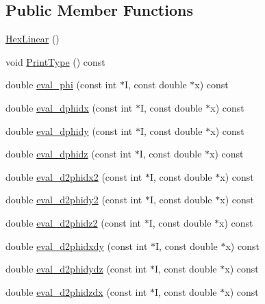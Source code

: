 \subsection*{Public Member Functions}
\begin{DoxyCompactItemize}
\item 
\mbox{\hyperlink{classfemus_1_1_hex_linear_a98a491b9c49bfb16056b1ef57e91d4a3}{Hex\+Linear}} ()
\item 
void \mbox{\hyperlink{classfemus_1_1_hex_linear_a6b28eaf73e48af3bf32ddd31991ec35e}{Print\+Type}} () const
\item 
double \mbox{\hyperlink{classfemus_1_1_hex_linear_ab6def48278382bd3f39856d158f08287}{eval\+\_\+phi}} (const int $\ast$I, const double $\ast$x) const
\item 
double \mbox{\hyperlink{classfemus_1_1_hex_linear_a4c26f08a33fb379f6d6b844ec0eac8c5}{eval\+\_\+dphidx}} (const int $\ast$I, const double $\ast$x) const
\item 
double \mbox{\hyperlink{classfemus_1_1_hex_linear_a04a870728a2d2d135fe8351315e42d7e}{eval\+\_\+dphidy}} (const int $\ast$I, const double $\ast$x) const
\item 
double \mbox{\hyperlink{classfemus_1_1_hex_linear_aed97c1006402d186cebd957fc3e20896}{eval\+\_\+dphidz}} (const int $\ast$I, const double $\ast$x) const
\item 
double \mbox{\hyperlink{classfemus_1_1_hex_linear_a76ae681b7882ed7ea9683dee6aabc5aa}{eval\+\_\+d2phidx2}} (const int $\ast$I, const double $\ast$x) const
\item 
double \mbox{\hyperlink{classfemus_1_1_hex_linear_a4a35e276ff9fac58e4ddd84ad147b726}{eval\+\_\+d2phidy2}} (const int $\ast$I, const double $\ast$x) const
\item 
double \mbox{\hyperlink{classfemus_1_1_hex_linear_a0f8c75ba515b33fdbe02d7c98a233273}{eval\+\_\+d2phidz2}} (const int $\ast$I, const double $\ast$x) const
\item 
double \mbox{\hyperlink{classfemus_1_1_hex_linear_ab3978e88ab01f8dcf7002024612523be}{eval\+\_\+d2phidxdy}} (const int $\ast$I, const double $\ast$x) const
\item 
double \mbox{\hyperlink{classfemus_1_1_hex_linear_a5d316275c3efe23b97b0aca494e33d8d}{eval\+\_\+d2phidydz}} (const int $\ast$I, const double $\ast$x) const
\item 
double \mbox{\hyperlink{classfemus_1_1_hex_linear_ae820d40b10b5e402a249f615e4b5f7da}{eval\+\_\+d2phidzdx}} (const int $\ast$I, const double $\ast$x) const
\end{DoxyCompactItemize}
